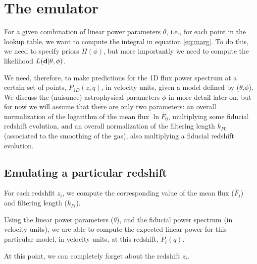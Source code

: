 \section{The emulator} \label{sec:emu}

For a given combination of linear power parameters $\theta$, i.e., for
each point in the lookup table, we want to compute the integral in
equation \ref{eq:marg}.
To do this, we need to specify priors $\Pi(\phi)$, but more importantly
we need to compute the likelihood $L(\mathbf{d} | \theta, \phi)$.

We need, therefore, to make predictions for the 1D flux power spectrum
at a certain set of points, $P_{1D}(z,q)$, in velocity units, given a model
defined by ($\theta$,$\phi$).
We discuss the (nuisance) astrophysical parameters $\phi$ in more detail
later on, but for now we will assume that there are only two parameters:
an overall normalization of the logarithm of the mean flux $\ln{\bar F_0}$,
multiplying some fiducial redshift evolution, and an overall normalization
of the filtering length $k_{F 0}$ (associated to the smoothing of the gas),
also multiplying a fiducial redshift evolution. 


\subsection{Emulating a particular redshift}

For each redshfit $z_i$, we compute the corresponding value of the mean flux
($\bar F_i$) and filtering length ($k_{Fi}$).

Using the linear power parameters ($\theta$), and the fiducial
power spectrum (in velocity units), we are able to compute the expected
linear power for this particular model, in velocity units, at this redshift,
$\tilde P_i(q)$.


At this point, we can completely forget about the redshift $z_i$.

